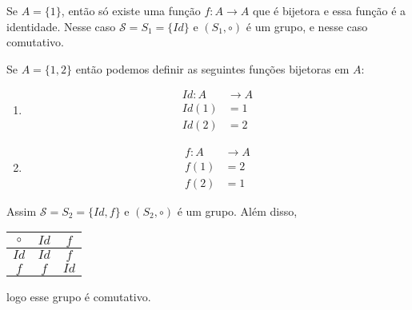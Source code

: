 Se $A = \{1\}$, então só existe uma função $f : A \to A$ que é bijetora e essa função é a identidade. Nesse caso $\mathcal{S} = S_1 = \{Id\}$ e $(S_1, \circ)$ é um grupo, e nesse caso comutativo.


Se $A = \{1, 2\}$ então podemos definir as seguintes funções bijetoras em $A$:
\begin{multicols}{2}
	\begin{enumerate}
		\item[] \begin{align*}
			Id : A &\to A\\ Id(1) &= 1\\ Id(2) &= 2
		\end{align*}
		\item[]  \begin{align*}
			f : A &\to A\\ f(1) &= 2\\ f(2) &= 1
		\end{align*}
	\end{enumerate}
\end{multicols}

Assim $\mathcal{S} = S_2 = \{Id, f\}$ e $(S_2, \circ)$ é um grupo. Além disso,
\begin{table}[!htb]
\centering
	\begin{tabular}{|c|c|c|} 
	    \hline
	    $\circ$ & $Id$ & $f$\T\\
	    \hline
	    $Id$ & $Id$ & $f$\T\\
	    \hline
	    $f$ & $f$ & $Id$\T\\
	    \hline
	\end{tabular}
\end{table}
logo esse grupo é comutativo.

